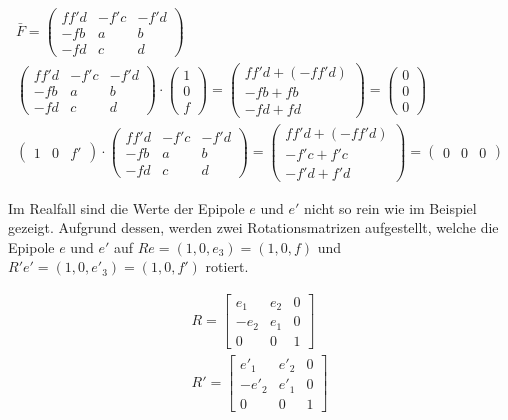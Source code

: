 \begin{gather}
	\bar{F} = \begin{pmatrix}
	ff'd&-f'c&-f'd\\
	-fb&a&b\\
	-fd&c&d\label{eq:FSampson}
	\end{pmatrix}\\
	\begin{pmatrix}
	ff'd&-f'c&-f'd\\
	-fb&a&b\\
	-fd&c&d
	\end{pmatrix} \cdot \begin{pmatrix}
	1\\0\\f
	\end{pmatrix} = 
	\begin{pmatrix}
	ff'd + (-ff'd)\\
	-fb + fb\\
	-fd +fd
	\end{pmatrix}
	= 
	\begin{pmatrix}
	0\\0\\0
	\end{pmatrix}\\
	\begin{pmatrix}
	1&0&f'
	\end{pmatrix} \cdot
	\begin{pmatrix}
	ff'd&-f'c&-f'd\\
	-fb&a&b\\
	-fd&c&d
	\end{pmatrix} =
	\begin{pmatrix}
	ff'd + (-ff'd)\\
	-f'c + f'c\\
	-f'd + f'd
	\end{pmatrix} = 
		\begin{pmatrix}
	0&0&0
	\end{pmatrix}
\end{gather}

Im Realfall sind die Werte der Epipole $e$ und $e'$ nicht so rein wie im Beispiel gezeigt. Aufgrund dessen, werden zwei Rotationsmatrizen aufgestellt, welche die Epipole $e$ und $e'$ auf $Re = (1,0,e_3) = (1,0,f)$ und $R'e' = (1,0,e'_3)=(1,0,f')$ rotiert.

\begin{gather}
	R = \begin{bmatrix}
		e_1&e_2&0\\
		-e_2&e_1&0\\
		0&0&1
	\end{bmatrix}\\
	R' = \begin{bmatrix}
	e'_1&e'_2&0\\
	-e'_2&e'_1&0\\
	0&0&1
\end{bmatrix}
\end{gather}\\

